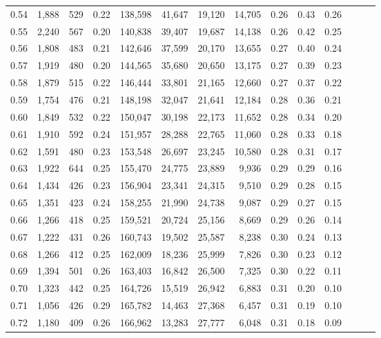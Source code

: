 \begin{tabular}{rrrrrrrrrrrrrr}
0.54 &  1,888 &  529 &  0.22 &  138,598 &   41,647 &  19,120 &  14,705 &  0.26 &  0.43 &      0.26 \\
0.55 &  2,240 &  567 &  0.20 &  140,838 &   39,407 &  19,687 &  14,138 &  0.26 &  0.42 &      0.25 \\
0.56 &  1,808 &  483 &  0.21 &  142,646 &   37,599 &  20,170 &  13,655 &  0.27 &  0.40 &      0.24 \\
0.57 &  1,919 &  480 &  0.20 &  144,565 &   35,680 &  20,650 &  13,175 &  0.27 &  0.39 &      0.23 \\
0.58 &  1,879 &  515 &  0.22 &  146,444 &   33,801 &  21,165 &  12,660 &  0.27 &  0.37 &      0.22 \\
0.59 &  1,754 &  476 &  0.21 &  148,198 &   32,047 &  21,641 &  12,184 &  0.28 &  0.36 &      0.21 \\
0.60 &  1,849 &  532 &  0.22 &  150,047 &   30,198 &  22,173 &  11,652 &  0.28 &  0.34 &      0.20 \\
0.61 &  1,910 &  592 &  0.24 &  151,957 &   28,288 &  22,765 &  11,060 &  0.28 &  0.33 &      0.18 \\
0.62 &  1,591 &  480 &  0.23 &  153,548 &   26,697 &  23,245 &  10,580 &  0.28 &  0.31 &      0.17 \\
0.63 &  1,922 &  644 &  0.25 &  155,470 &   24,775 &  23,889 &   9,936 &  0.29 &  0.29 &      0.16 \\
0.64 &  1,434 &  426 &  0.23 &  156,904 &   23,341 &  24,315 &   9,510 &  0.29 &  0.28 &      0.15 \\
0.65 &  1,351 &  423 &  0.24 &  158,255 &   21,990 &  24,738 &   9,087 &  0.29 &  0.27 &      0.15 \\
0.66 &  1,266 &  418 &  0.25 &  159,521 &   20,724 &  25,156 &   8,669 &  0.29 &  0.26 &      0.14 \\
0.67 &  1,222 &  431 &  0.26 &  160,743 &   19,502 &  25,587 &   8,238 &  0.30 &  0.24 &      0.13 \\
0.68 &  1,266 &  412 &  0.25 &  162,009 &   18,236 &  25,999 &   7,826 &  0.30 &  0.23 &      0.12 \\
0.69 &  1,394 &  501 &  0.26 &  163,403 &   16,842 &  26,500 &   7,325 &  0.30 &  0.22 &      0.11 \\
0.70 &  1,323 &  442 &  0.25 &  164,726 &   15,519 &  26,942 &   6,883 &  0.31 &  0.20 &      0.10 \\
0.71 &  1,056 &  426 &  0.29 &  165,782 &   14,463 &  27,368 &   6,457 &  0.31 &  0.19 &      0.10 \\
0.72 &  1,180 &  409 &  0.26 &  166,962 &   13,283 &  27,777 &   6,048 &  0.31 &  0.18 &      0.09 \\

\end{tabular}
